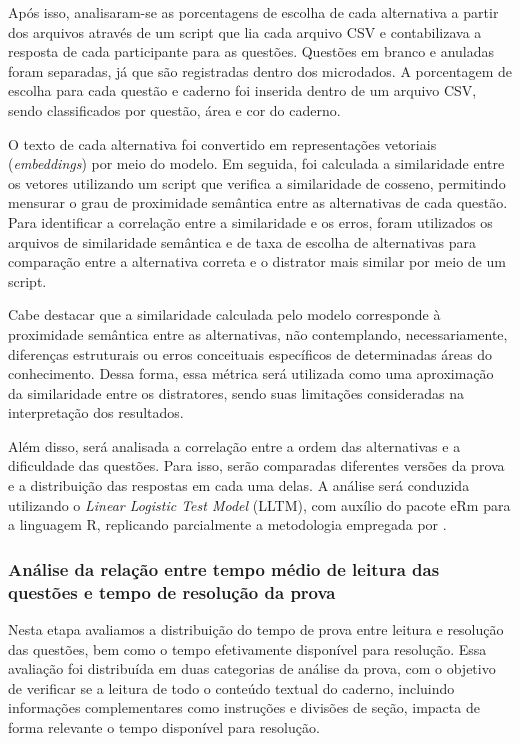 \documentclass[a4paper,10pt, twocolumn]{article}
\begin{document}
Após isso, analisaram-se as porcentagens de escolha de cada alternativa a partir dos arquivos através de um script que lia cada arquivo CSV e contabilizava a resposta de cada participante para as questões. Questões em branco e anuladas foram separadas, já que são registradas dentro dos microdados. A porcentagem de escolha para cada questão e caderno foi inserida dentro de um arquivo CSV, sendo classificados por questão, área e cor do caderno. 

O texto de cada alternativa foi convertido em representações vetoriais (\textit{embeddings}) por meio do modelo. Em seguida, foi calculada a similaridade entre os vetores utilizando um script que verifica a similaridade de cosseno, permitindo mensurar o grau de proximidade semântica entre as alternativas de cada questão. Para identificar a correlação entre a similaridade e os erros, foram utilizados os arquivos de similaridade semântica e de taxa de escolha de alternativas para comparação entre a alternativa correta e o distrator mais similar por meio de um script.


Cabe destacar que a similaridade calculada pelo modelo corresponde à proximidade semântica entre as alternativas, não contemplando, necessariamente, diferenças estruturais ou erros conceituais específicos de determinadas áreas do conhecimento. Dessa forma, essa métrica será utilizada como uma aproximação da similaridade entre os distratores, sendo suas limitações consideradas na interpretação dos resultados.

Além disso, será analisada a correlação entre a ordem das alternativas e a dificuldade das questões. Para isso, serão comparadas diferentes versões da prova e a distribuição das respostas em cada uma delas. A análise será conduzida utilizando o \textit{Linear Logistic Test Model} (LLTM), com auxílio do pacote eRm para a linguagem R, replicando parcialmente a metodologia empregada por \textcite{hohensinn_does_nodate}.

\subsubsection{Análise da relação entre tempo médio de leitura das questões e tempo de resolução da prova}
\label{sec:tempo-leitura}

Nesta etapa avaliamos a distribuição do tempo de prova entre leitura e resolução das questões, bem como o tempo efetivamente disponível para resolução. Essa avaliação foi distribuída em duas categorias de análise da prova, com o objetivo de verificar se a leitura de todo o conteúdo textual do caderno, incluindo informações complementares como instruções e divisões de seção, impacta de forma relevante o tempo disponível para resolução.
\end{document}
